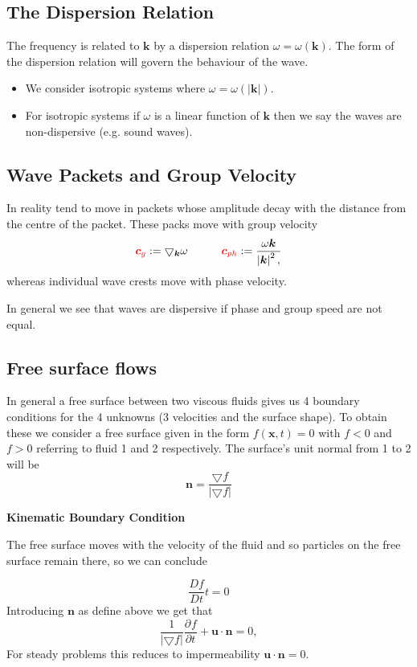 \documentclass[11pt]{article}
\newcommand*{\pd}[3][]{\ensuremath{\frac{\partial^{#1} {#2}}{\partial {#3}^{#1}}}}
\newcommand*{\md}[1]{\ensuremath{\frac{D #1}{D t}}}
\newcommand{\grad}{\bigtriangledown}
\newcommand{\defeq}{:=}
\newcommand{\mv}[1]{\bm{#1}}
\newcommand{\mdf}[1]{{\color{red}#1}}
\newcommand{\abs}[1]{\left|#1\right|}
\newenvironment{defin}
	{\begin{mdframed}[backgroundcolor=white, roundcorner=5pt, linewidth=1pt]
		\setlength{\parindent}{0pt}
		}
	{\end{mdframed}}
\begin{document}
\subsection{The Dispersion Relation}
The frequency is related to $\mv{k}$ by a \mdf{dispersion relation} $\omega=\omega(\mv{k})$.
The form of the dispersion relation will govern the behaviour of the wave.
\begin{itemize}
	\item We consider \mdf{isotropic systems} where $\omega=\omega(\abs{\mv{k}})$.
	\item For isotropic systems if $\omega$ is a linear function of $\mv{k}$ then we say the waves are \mdf{non-dispersive} (e.g. sound waves).
\end{itemize}

\subsection{Wave Packets and Group Velocity}
In reality tend to move in packets whose amplitude decay with the distance from the centre of the packet.
These packs move with \mdf{group velocity}
\[
	\mdf{\mv{c}_g} \defeq \grad_{\mv{k}}\omega \quad\quad\quad
	\mdf{\mv{c}_{ph}}\defeq \frac{\omega\mv{k}}{\abs{\mv{k}}^2,}
\]
whereas individual wave crests move with phase velocity.

\begin{defin}
	In general we see that waves are \mdf{dispersive} if phase and group speed are not equal.
\end{defin}

\subsection{Free surface flows}
In general a free surface between two viscous fluids gives us 4 boundary conditions for the 4 unknowns (3 velocities and the surface shape).
To obtain these we consider a free surface given in the form $f(\mv{x}, t)=0$ with $f<0$ and $f>0$ referring to fluid 1 and 2 respectively.
The surface's unit normal from 1 to 2 will be
\[
	\mv{n} = \frac{\grad{f}}{\abs{\grad{f}}}
\]

\noindent\textbf{Kinematic Boundary Condition}

The free surface moves with the velocity of the fluid and so particles on the free surface remain there, so we can conclude

\[
	\md{f}{t} =0
\]
Introducing $\mv{n}$ as define above we get that
\[
	\frac{1}{\abs{\grad{f}}}\pd{f}{t}+ \mv{u}\cdot \mv{n} = 0,
\]
For steady problems this reduces to impermeability $\mv{u}\cdot\mv{n}=0$.
\end{document}
